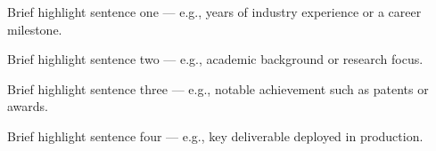 \begin{highlights}
  \item[\textbullet]{Brief highlight sentence one — e.g., years of industry experience or a career milestone.}
  \item[\textbullet]{Brief highlight sentence two — e.g., academic background or research focus.}
  \item[\textbullet]{Brief highlight sentence three — e.g., notable achievement such as patents or awards.}
  \item[\textbullet]{Brief highlight sentence four — e.g., key deliverable deployed in production.}
\end{highlights}
